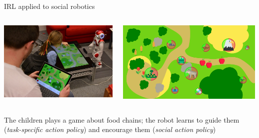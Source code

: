 \documentclass[xcolor=table]{beamer}
\begin{document}
{

\begin{frame}{IRL applied to social robotics}

    \begin{columns}
        \begin{column}{0.5\linewidth}

            \includegraphics[width=\linewidth]{sparc/overview}

        \end{column}
        \begin{column}{0.5\linewidth}
            \includegraphics[width=\linewidth]{sparc/gui}
        \end{column}
    \end{columns}

    The children plays a game about food chains; the robot learns to guide them
    (\emph{task-specific action policy}) and encourage them (\emph{social action
    policy})


\end{frame}}
\end{document}
